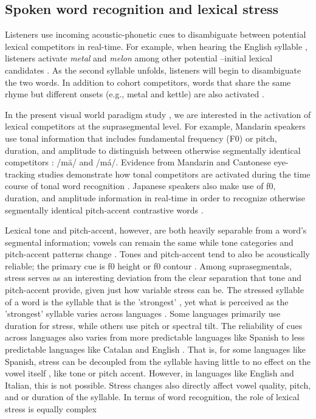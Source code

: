 \subsection{Spoken word recognition and lexical stress}

Listeners use incoming acoustic-phonetic cues to disambiguate between potential lexical competitors in real-time. For example, when hearing the English syllable , listeners activate \textit{metal} and \textit{melon} among other potential --initial lexical candidates \citep{Marslen1980}. As the second syllable unfolds, listeners will begin to disambiguate the two words. In addition to cohort competitors, words that share the same rhyme but different onsets (e.g., metal and kettle) are also activated \citep{Allopenna_1998}.

In the present visual world paradigm study \citep{Tanenhaus_Spivey-Knowlton_Eberhard_Sedivy_1995}, we are interested in the activation of lexical competitors at the suprasegmental level. For example, Mandarin speakers use tonal information that includes fundamental frequency (F0) or pitch, duration, and amplitude to distinguish between otherwise segmentally identical competitors \citep{Lee2008, Zhang2022, fox_1985}: /m\=a/ and /m\'a/. Evidence from Mandarin and Cantonese eye-tracking studies demonstrate how tonal competitors are activated during the time course of tonal word recognition \citep{zou_2022, qin_2022, Nixon2016}. Japanese speakers also make use of f0, duration, and amplitude information in real-time in order to recognize otherwise segmentally identical pitch-accent contrastive words \citep{goss_2014, Cutler1999, Ito2024}.

Lexical tone and pitch-accent, however, are both heavily separable from a word's segmental information; vowels can remain the same while tone categories and pitch-accent patterns change \citep{Zeng2017}. Tones and pitch-accent tend to also be acoustically reliable; the primary cue is f0 height or f0 contour \citep{goss_2014}. Among suprasegmentals, stress serves as an interesting deviation from the clear separation that tone and pitch-accent provide, given just how variable stress can be. The stressed syllable of a word is the syllable that is the 'strongest' \citep{sluijter1996spectral}, yet what is perceived as the 'strongest' syllable varies across languages \citep{Cutler1988}. Some languages primarily use duration for stress, while others use pitch or spectral tilt. The reliability of cues across languages also varies from more predictable languages like Spanish to less predictable languages like Catalan and English \citep{ortega_2011, beckman_1994}. That is, for some languages like Spanish, stress can be decoupled from the syllable having little to no effect on the vowel itself \citep{ortega_2011}, like tone or pitch accent. However, in languages like English and Italian, this is not possible. Stress changes also directly affect vowel quality, pitch, and or duration of the syllable. In terms of word recognition, the role of lexical stress is equally complex \citep{cutler2001voornaam, Reinisch2010}

